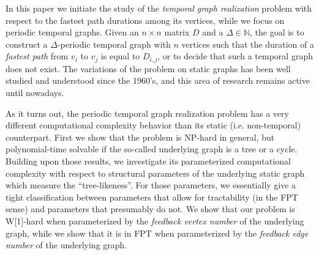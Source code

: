 In this paper we initiate the study of the \emph{temporal graph realization} problem with respect to the fastest path durations among its vertices, while we focus on periodic temporal graphs. Given an $n \times n$ matrix $D$ and a $\Delta \in \mathbb{N}$, the goal is to construct a $\Delta$-periodic temporal graph with $n$ vertices such that the duration of a \emph{fastest path} from $v_i$ to $v_j$ is equal to $D_{i,j}$, or to decide that such a temporal graph does not exist. The variations of the problem on static graphs has been well studied and understood since the 1960's, and this area of research remains active until nowadays. 

As it turns out, the periodic temporal graph realization problem has a very different computational complexity behavior than its static (i.e. non-temporal) counterpart. First we show that the problem is NP-hard in general, but polynomial-time solvable if the so-called underlying graph is a tree or a cycle. Building upon those results, we investigate its parameterized computational complexity with respect to structural parameters of the underlying static graph which measure the ``tree-likeness''. For those parameters, we essentially give a tight classification between parameters that allow for tractability (in the FPT sense) and parameters that presumably do not. We show that our problem is W[1]-hard when parameterized by the \emph{feedback vertex number} of the underlying graph, while we show that it is in FPT when parameterized by the \emph{feedback edge number} of the underlying graph. 